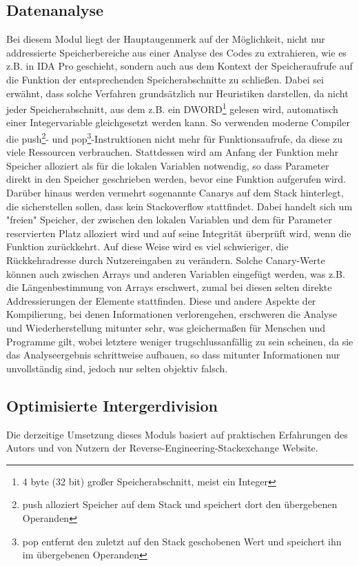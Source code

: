 \documentclass[11pt]{article} %
\begin{document}
\begin{multicols}{2}
\subsection{Datenanalyse}
Bei diesem Modul liegt der Hauptaugenmerk auf der Möglichkeit, nicht nur addressierte Speicherbereiche aus einer Analyse des Codes zu extrahieren, wie es z.B. in IDA Pro geschieht, sondern auch aus dem Kontext der Speicheraufrufe auf die Funktion der entsprechenden Speicherabschnitte zu schließen. Dabei sei erwähnt, dass solche Verfahren grundsätzlich nur Heuristiken darstellen, da nicht jeder Speicherabschnitt, aus dem z.B. ein DWORD\footnote{4 byte (32 bit) großer Speicherabschnitt, meist ein Integer} gelesen wird, automatisch einer Integervariable gleichgesetzt werden kann. So verwenden moderne Compiler die push\footnote{push alloziert Speicher auf dem Stack und speichert dort den übergebenen Operanden}- und pop\footnote{pop entfernt den zuletzt auf den Stack geschobenen Wert und speichert ihn im übergebenen Operanden}-Instruktionen nicht mehr für Funktionsaufrufe, da diese zu viele Ressourcen verbrauchen. Stattdessen wird am Anfang der Funktion mehr Speicher alloziert als für die lokalen Variablen notwendig, so dass Parameter direkt in den Speicher geschrieben werden, bevor eine Funktion aufgerufen wird. Darüber hinaus werden vermehrt sogenannte Canarys auf dem Stack hinterlegt, die sicherstellen sollen, dass kein Stackoverflow stattfindet. Dabei handelt sich um "freien" Speicher, der zwischen den lokalen Variablen und dem für Parameter reservierten Platz alloziert wird und auf seine Integrität überprüft wird, wenn die Funktion zurückkehrt. Auf diese Weise wird es viel schwieriger, die Rückkehradresse durch Nutzereingaben zu verändern. Solche Canary-Werte können auch zwischen Arrays und anderen Variablen eingefügt werden, was z.B. die Längenbestimmung von Arrays erschwert, zumal bei diesen selten direkte Addressierungen der Elemente stattfinden. Diese und andere Aspekte der Kompilierung, bei denen Informationen verlorengehen, erschweren die Analyse und Wiederherstellung mitunter sehr, was gleichermaßen für Menschen und Programme gilt, wobei letztere weniger trugschlussanfällig zu sein scheinen, da sie das Analyseergebnis schrittweise aufbauen, so dass mitunter Informationen nur unvollständig sind, jedoch nur selten objektiv falsch.

\subsection{Optimisierte Intergerdivision}
Die derzeitige Umsetzung dieses Moduls basiert auf praktischen Erfahrungen des Autors und von Nutzern der Reverse-Engineering-Stackexchange Website\cite{stackexchange:1}.


\end{multicols}
\end{document}
